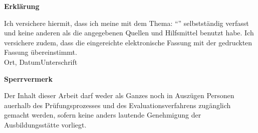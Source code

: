 

\newpage
\thispagestyle{empty}
\begin{framed}
\begin{center}
\Large\bfseries Erklärung
\end{center}
\medskip
\noindent
Ich versichere hiermit, dass ich meine \Was mit dem Thema:
\enquote{\Titel}
selbstständig verfasst und keine anderen als die angegebenen Quellen und Hilfsmittel benutzt habe. Ich versichere zudem, dass die eingereichte elektronische Fassung mit der gedruckten Fassung übereinstimmt.
\vspace{3cm}
\noindent
\underline{\hspace{0cm}}\hfill\underline{\hspace{15cm}}\\
Ort, Datum\hfill Unterschrift\hspace{4cm}
\end{framed}

\vfill
\begin{framed}
\begin{center}
\Large\bfseries Sperrvermerk
\end{center}
\medskip
\noindent
Der Inhalt dieser Arbeit darf weder als Ganzes noch in Auszügen Personen
auerhalb des Prüfungsprozesses und des Evaluationsverfahrens zugänglich gemacht
werden, sofern keine anders lautende Genehmigung der Ausbildungsstätte vorliegt.
\end{framed}

\endinput
